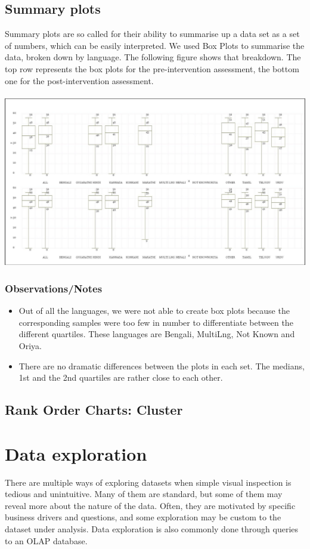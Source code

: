 \documentclass[10pt]{article}
\begin{document}
\newpage
\subsection{Summary plots}
Summary plots are so called for their ability to summarise up a data set as a set of numbers, which can be easily interpreted. We used Box Plots to summarise the data, broken down by language. The following figure shows that breakdown. The top row represents the box plots for the pre-intervention assessment, the bottom one for the post-intervention assessment.\\\\
\includegraphics[width=160mm]{ReportMedia/BoxPlotPrePost.jpg}
\subsubsection{Observations/Notes}
\begin{itemize}
\item Out of all the languages, we were not able to create box plots because the corresponding samples were too few in number to differentiate between the different quartiles. These languages are Bengali, MultiLng, Not Known and Oriya.
\item There are no dramatic differences between the plots in each set. The medians, 1st and the 2nd quartiles are rather close to each other.
\end{itemize}

\newpage
\subsection{Rank Order Charts: Cluster}

\newpage
\section{Data exploration}
There are multiple ways of exploring datasets when simple visual inspection is tedious and unintuitive. Many of them are standard, but some of them may reveal more about the nature of the data. Often, they are motivated by specific business drivers and questions, and some exploration may be custom to the dataset under analysis. Data exploration is also commonly done through queries to an OLAP database.
\newpage
\end{document}
